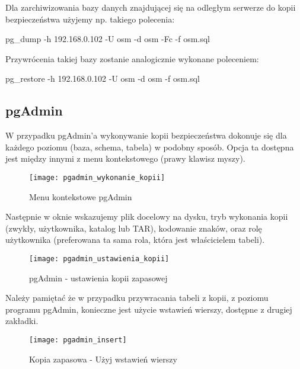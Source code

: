 Dla zarchiwizowania bazy danych znajdującej się na odległym serwerze do kopii bezpieczeństwa użyjemy np. takiego polecenia:

\colorbox{code-gray}{pg\_dump -h 192.168.0.102 -U osm -d osm -Fc -f osm.sql}

\noindent Przywrócenia takiej bazy zostanie analogicznie wykonane poleceniem: 

\colorbox{code-gray}{pg\_restore -h 192.168.0.102 -U osm -d osm -f osm.sql}
	\subsection{pgAdmin}
	W przypadku pgAdmin'a wykonywanie kopii bezpieczeństwa dokonuje się dla każdego poziomu (baza, schema, tabela) w podobny sposób. Opcja ta dostępna jest między innymi z menu kontekstowego (prawy klawisz myszy). 
		\begin{figure}[!ht]
			\centering
			\texttt{[image: pgadmin\_wykonanie\_kopii]}
			\caption{Menu kontekstowe pgAdmin}
		\end{figure}
	Następnie w oknie wskazujemy plik docelowy na dysku, tryb wykonania kopii (zwykły, użytkownika, katalog lub TAR), kodowanie znaków, oraz rolę użytkownika (preferowana ta sama rola, która jest właścicielem tabeli).	
		\begin{figure}[!ht]
			\centering
			\texttt{[image: pgadmin\_ustawienia\_kopii]}
			\caption{pgAdmin - ustawienia kopii zapasowej}
		\end{figure}
	Należy pamiętać że w przypadku przywracania tabeli z kopii, z poziomu programu pgAdmin, konieczne jest użycie wstawień wierszy, dostępne z drugiej zakładki. 
	\begin{figure}[!ht]
		\centering
		\texttt{[image: pgadmin\_insert]}
		\caption{Kopia zapasowa - Użyj wstawień wierszy}
		\end{figure}
	
	
